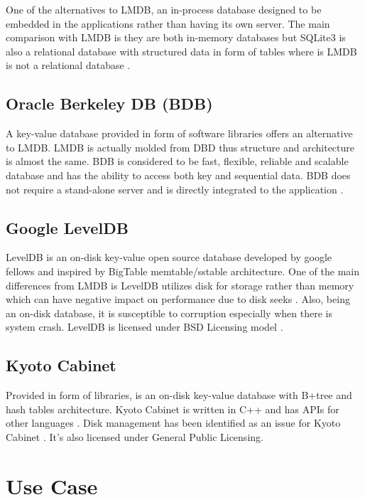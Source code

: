 \documentclass[9pt,twocolumn,twoside]{../../styles/osajnl}
\begin{document}
One of the alternatives to LMDB, an in-process database designed to be
embedded in the applications rather than having its own server. The
main comparison with LMDB is they are both in-memory databases but
SQLite3 is also a relational database with structured data in form of
tables where is LMDB is not a relational database \cite{www-sqlite}.

\subsection{Oracle Berkeley DB (BDB)}

A key-value database provided in form of software libraries offers an
alternative to LMDB. LMDB is actually molded from DBD thus structure
and architecture is almost the same. BDB is considered to be fast,
flexible, reliable and scalable database and has the ability to access
both key and sequential data. BDB does not require a stand-alone
server and is directly integrated to the application \cite{www-bdb}.

\subsection{Google LevelDB}

LevelDB is an on-disk key-value open source database developed by
google fellows and inspired by BigTable memtable/sstable
architecture. One of the main differences from LMDB is LevelDB
utilizes disk for storage rather than memory which can have negative
impact on performance due to disk seeks \cite{www-riak}. Also, being
an on-disk database, it is susceptible to corruption especially when
there is system crash. LevelDB is licensed under BSD Licensing model
\cite{www-leveldb}.

\subsection{Kyoto Cabinet}

Provided in form of libraries, is an on-disk key-value database with
B+tree and hash tables architecture. Kyoto Cabinet is written in C++
and has APIs for other languages \cite{www-fallabs}. Disk management
has been identified as an issue for Kyoto Cabinet
\cite{www-kyoto}. It’s also licensed under General Public Licensing.

\section{Use Case}
\end{document}
